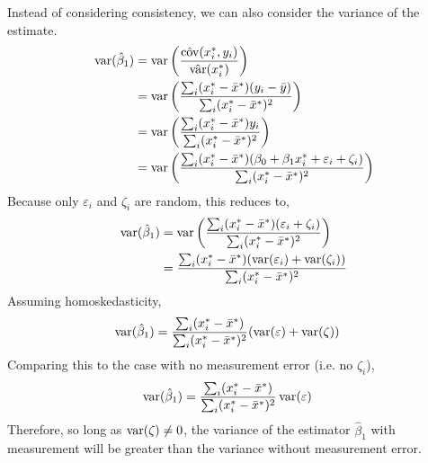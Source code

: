 \documentclass[12pt,twoside]{article}
\begin{document}
\begin{problems}
\begin{problemparts}
Instead of considering consistency, we can also consider the variance of the
estimate.
\begin{align*}
    \operatorname{var}(\hat{\beta}_1) &= \operatorname{var}\left(\frac{\hat{\operatorname{cov}}(x_i^*,
    y_i)}{\hat{\operatorname{var}}(x_i^*)}\right) \\
    &= \operatorname{var}\left(\frac{\sum_i (x_i^* - \bar{x}^*) (y_i - \bar{y})}{\sum_i
    (x_i^* - \bar{x}^*)^2}\right) \\
    &= \operatorname{var}\left(\frac{\sum_i (x_i^* - \bar{x}^*) y_i}{\sum_i (x_i^* -
    \bar{x}^*)^2}\right) \\
    &= \operatorname{var}\left(\frac{\sum_i (x_i^* - \bar{x}^*) (\beta_0 + \beta_1 x_i^* +
    \varepsilon_i + \zeta_i)}{\sum_i (x_i^* - \bar{x}^*)^2}\right)
\end{align*}
Because only $\varepsilon_i$ and $\zeta_i$ are random, this reduces to,
\begin{align*}
    \operatorname{var}(\hat{\beta}_1) &= \operatorname{var}\left(\frac{\sum_i (x_i^* - \bar{x}^*)
    (\varepsilon_i + \zeta_i)}{\sum_i (x_i^* - \bar{x}^*)^2}\right) \\
    &= \frac{\sum_i (x_i^* - \bar{x}^*)(\operatorname{var} (\varepsilon_i) + \operatorname{var}
    (\zeta_i))}{\sum_i (x_i^* - \bar{x}^*)^2}
\end{align*}
Assuming homoskedasticity,
\begin{align*}
    \operatorname{var}(\hat{\beta}_1) &= \frac{\sum_i (x_i^* - \bar{x}^*)}{\sum_i (x_i^* -
    \bar{x}^*)^2}(\operatorname{var} (\varepsilon) + \operatorname{var} (\zeta))
\end{align*}
Comparing this to the case with no measurement error (i.e. no $\zeta_i$),
\begin{align*}
    \operatorname{var}(\hat{\beta}_1) &= \frac{\sum_i (x_i^* - \bar{x}^*)}{\sum_i (x_i^* -
    \bar{x}^*)^2}\operatorname{var} (\varepsilon)
\end{align*}
Therefore, so long as $\operatorname{var}(\zeta) \neq 0$, the variance of the estimator
$\hat{\beta}_1$ with measurement will be greater than the variance without
measurement error.

\end{problemparts}

\newpage

\problem  %

\begin{problemparts}

\problempart %


\end{problemparts}
\end{problems}
\end{document}
